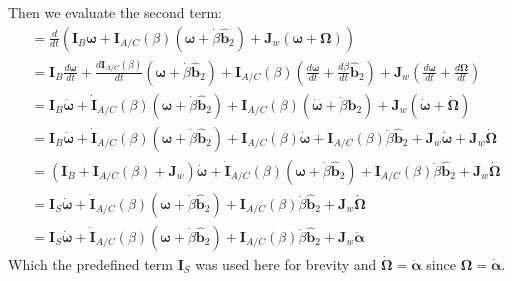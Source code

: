 \documentclass[titlepage]{article}
\begin{document}
Then we evaluate the second term:
\begin{equation}
	\begin{split}
		&=\frac{d}{dt}\left(\boldsymbol{I}_B\boldsymbol{\omega}+\boldsymbol{I}_{A/C}(\beta)\left(\boldsymbol{\omega}+\dot{\beta}\hat{\boldsymbol{b}}_2\right)+\boldsymbol{J}_w\left(\boldsymbol{\omega}+\boldsymbol{\Omega}\right)\right) \\
		&=\boldsymbol{I}_B\frac{d\boldsymbol{\omega}}{dt}+\frac{d\boldsymbol{I}_{A/C}(\beta)}{dt}\left(\boldsymbol{\omega}+\dot{\beta}\hat{\boldsymbol{b}}_2\right)+\boldsymbol{I}_{A/C}(\beta)\left(\frac{d\boldsymbol{\omega}}{dt}+\frac{d\dot{\beta}}{dt}\hat{\boldsymbol{b}}_2\right)+\boldsymbol{J}_w\left(\frac{d\boldsymbol{\omega}}{dt}+\frac{d\boldsymbol{\Omega}}{dt}\right) \\
		&=\boldsymbol{I}_B\dot{\boldsymbol{\omega}}+\dot{\boldsymbol{I}}_{A/C}(\beta)\left(\boldsymbol{\omega}+\dot{\beta}\hat{\boldsymbol{b}}_2\right)+\boldsymbol{I}_{A/C}(\beta)\left(\dot{\boldsymbol{\omega}}+\ddot{\beta}\hat{\boldsymbol{b}}_2\right)+\boldsymbol{J}_w\left(\dot{\boldsymbol{\omega}}+\dot{\boldsymbol{\Omega}}\right) \\
		&=\boldsymbol{I}_B\dot{\boldsymbol{\omega}}+\dot{\boldsymbol{I}}_{A/C}(\beta)\left(\boldsymbol{\omega}+\dot{\beta}\hat{\boldsymbol{b}}_2\right)+\boldsymbol{I}_{A/C}(\beta)\dot{\boldsymbol{\omega}}+\boldsymbol{I}_{A/C}(\beta)\ddot{\beta}\hat{\boldsymbol{b}}_2+\boldsymbol{J}_w\dot{\boldsymbol{\omega}}+\boldsymbol{J}_w\dot{\boldsymbol{\Omega}} \\
		&=\left(\boldsymbol{I}_B+\boldsymbol{I}_{A/C}(\beta)+\boldsymbol{J}_w\right)\dot{\boldsymbol{\omega}}+\dot{\boldsymbol{I}}_{A/C}(\beta)\left(\boldsymbol{\omega}+\dot{\beta}\hat{\boldsymbol{b}}_2\right)+\boldsymbol{I}_{A/C}(\beta)\ddot{\beta}\hat{\boldsymbol{b}}_2+\boldsymbol{J}_w\dot{\boldsymbol{\Omega}} \\
		&=\boldsymbol{I}_S\dot{\boldsymbol{\omega}}+\dot{\boldsymbol{I}}_{A/C}(\beta)\left(\boldsymbol{\omega}+\dot{\beta}\hat{\boldsymbol{b}}_2\right)+\boldsymbol{I}_{A/C}(\beta)\ddot{\beta}\hat{\boldsymbol{b}}_2+\boldsymbol{J}_w\dot{\boldsymbol{\Omega}} \\
		&=\boldsymbol{I}_S\dot{\boldsymbol{\omega}}+\dot{\boldsymbol{I}}_{A/C}(\beta)\left(\boldsymbol{\omega}+\dot{\beta}\hat{\boldsymbol{b}}_2\right)+\boldsymbol{I}_{A/C}(\beta)\ddot{\beta}\hat{\boldsymbol{b}}_2+\boldsymbol{J}_w\ddot{\boldsymbol{\alpha}}
	\end{split}
\end{equation}
Which the predefined term $\boldsymbol{I}_S$ was used here for brevity and $\dot{\boldsymbol{\Omega}}=\ddot{\boldsymbol{\alpha}}$ since $\boldsymbol{\Omega}=\dot{\boldsymbol{\alpha}}$.\\
\end{document}
